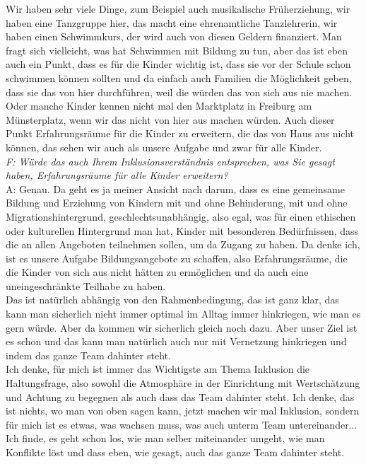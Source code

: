 \begin{linenumbers*}
Wir haben sehr viele Dinge, zum Beispiel auch musikalische Früherziehung, wir haben eine Tanzgruppe hier, das macht eine ehrenamtliche Tanzlehrerin, wir haben einen Schwimmkurs, der wird auch von diesen Geldern finanziert. Man fragt sich vielleicht, was hat Schwimmen mit Bildung zu tun, aber das ist eben auch ein Punkt, dass es für die Kinder wichtig ist, dass sie vor der Schule schon schwimmen können sollten und da einfach auch Familien die Möglichkeit geben, dass sie das von hier durchführen, weil die würden das von sich aus nie machen.\\
Oder manche Kinder kennen nicht mal den Marktplatz in Freiburg am Münsterplatz, wenn wir das nicht von hier aus machen würden.
Auch dieser Punkt Erfahrungsräume für die Kinder zu erweitern, die das von Haus aus nicht können, das sehen wir auch als unsere Aufgabe und zwar für alle Kinder.\\
\emph{F: Würde das auch Ihrem Inklusionsverständnis entsprechen, was Sie gesagt haben, Erfahrungsräume für alle Kinder erweitern?}\\
A: Genau. Da geht es ja meiner Ansicht nach darum, dass es eine gemeinsame Bildung und Erziehung von Kindern mit und ohne Behinderung, mit und ohne Migrationshintergrund, geschlechtsunabhängig, also egal, was für einen ethischen oder kulturellen Hintergrund man hat, Kinder mit besonderen Bedürfnissen, dass die an allen Angeboten teilnehmen sollen, um da Zugang zu haben. 
Da denke ich, ist es unsere Aufgabe Bildungsangebote zu schaffen, also Erfahrungsräume, die die Kinder von sich aus nicht hätten zu ermöglichen und da auch eine uneingeschränkte Teilhabe zu haben.\\
Das ist natürlich abhängig von den Rahmenbedingung, das ist ganz klar, das kann man sicherlich nicht immer optimal im Alltag immer hinkriegen, wie man es gern würde. Aber da kommen wir sicherlich gleich noch dazu. Aber unser Ziel ist es schon und das kann man natürlich auch nur mit Vernetzung hinkriegen und indem das ganze Team dahinter steht. \\
Ich denke, für mich ist immer das Wichtigste am Thema Inklusion die Haltungsfrage, also sowohl die Atmosphäre in der Einrichtung mit Wertschätzung und Achtung zu begegnen als auch dass das Team dahinter steht. Ich denke, das ist nichts, wo man von oben sagen kann, jetzt machen wir mal Inklusion, sondern für mich ist es etwas, was wachsen muss, was auch unterm Team untereinander... Ich finde, es geht schon los, wie man selber miteinander umgeht, wie man Konflikte löst und dass eben, wie gesagt, auch das ganze Team dahinter steht.  


\end{linenumbers*}
